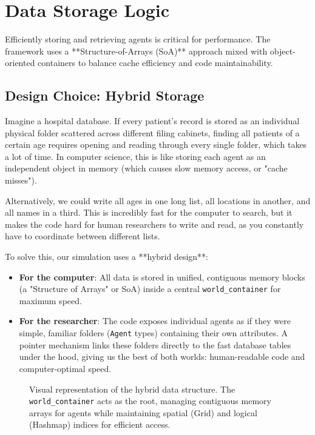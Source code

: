 \section{Data Storage Logic}
Efficiently storing and retrieving agents is critical for performance. The framework uses a **Structure-of-Arrays (SoA)** approach mixed with object-oriented containers to balance cache efficiency and code maintainability.

\subsection{Design Choice: Hybrid Storage}
Imagine a hospital database. If every patient's record is stored as an individual physical folder scattered across different filing cabinets, finding all patients of a certain age requires opening and reading through every single folder, which takes a lot of time. In computer science, this is like storing each agent as an independent object in memory (which causes slow memory access, or "cache misses").

Alternatively, we could write all ages in one long list, all locations in another, and all names in a third. This is incredibly fast for the computer to search, but it makes the code hard for human researchers to write and read, as you constantly have to coordinate between different lists.

To solve this, our simulation uses a **hybrid design**:
\begin{itemize}
    \item \textbf{For the computer}: All data is stored in unified, contiguous memory blocks (a "Structure of Arrays" or SoA) inside a central \texttt{world\_container} for maximum speed.
    \item \textbf{For the researcher}: The code exposes individual agents as if they were simple, familiar folders (\texttt{Agent} types) containing their own attributes. A pointer mechanism links these folders directly to the fast database tables under the hood, giving us the best of both worlds: human-readable code and computer-optimal speed.
\end{itemize}


\begin{figure}[H]
    \centering
    \scalebox{0.7}{}
    \caption{Visual representation of the hybrid data structure. The \texttt{world\_container} acts as the root, managing contiguous memory arrays for agents while maintaining spatial (Grid) and logical (Hashmap) indices for efficient access.}
    \label{fig:data_structure_diagram}
\end{figure}

